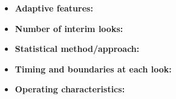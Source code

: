 \begin{itemize}
    \item \textbf{Adaptive features: } %
    \item \textbf{Number of interim looks: } %
    \item \textbf{Statistical method/approach: } %
    \item \textbf{Timing and boundaries at each look: }
    \item \textbf{Operating characteristics: }
\end{itemize}